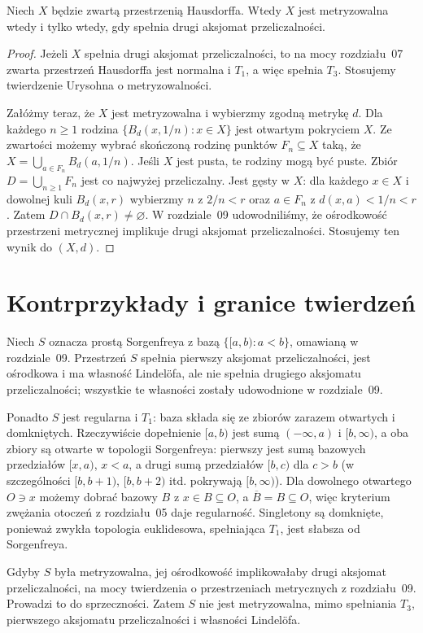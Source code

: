 \begin{wniosek}
\label{cor:topog-zwarta-hausdorff-metryzowalna}
Niech $X$ będzie zwartą przestrzenią Hausdorffa.
Wtedy $X$ jest metryzowalna wtedy i tylko wtedy, gdy
spełnia drugi aksjomat przeliczalności.
\end{wniosek}
\begin{proof}
Jeżeli $X$ spełnia drugi aksjomat przeliczalności,
to na mocy rozdziału~07 zwarta przestrzeń Hausdorffa
jest normalna i $T_1$, a więc spełnia $T_3$.
Stosujemy twierdzenie Urysohna o metryzowalności.

Załóżmy teraz, że $X$ jest metryzowalna i wybierzmy
zgodną metrykę $d$. Dla każdego $n\ge1$ rodzina
$\{B_d(x,1/n):x\in X\}$ jest otwartym pokryciem $X$.
Ze zwartości możemy wybrać skończoną rodzinę
punktów $F_n\subseteq X$ taką, że
$X=\bigcup_{a\in F_n}B_d(a,1/n)$.
Jeśli $X$ jest pusta, te rodziny mogą być puste.
Zbiór $D=\bigcup_{n\ge1}F_n$ jest co najwyżej
przeliczalny. Jest gęsty w $X$: dla każdego
$x\in X$ i dowolnej kuli $B_d(x,r)$ wybierzmy
$n$ z $2/n<r$ oraz $a\in F_n$ z $d(x,a)<1/n<r$.
Zatem $D\cap B_d(x,r)\ne\varnothing$.
W rozdziale~09 udowodniliśmy, że ośrodkowość
przestrzeni metrycznej implikuje drugi aksjomat
przeliczalności. Stosujemy ten wynik do $(X,d)$.
\end{proof}

\section{Kontrprzykłady i granice twierdzeń}
\label{sec:topog-metryzowalnosc-kontrprzyklady}

\begin{przyklad}
\label{ex:topog-sorgenfrey-niemetryzowalna}
Niech $S$ oznacza prostą Sorgenfreya z bazą
$\{[a,b):a<b\}$, omawianą w rozdziale~09.
Przestrzeń $S$ spełnia pierwszy aksjomat przeliczalności,
jest ośrodkowa i ma własność Lindelöfa, ale nie spełnia
drugiego aksjomatu przeliczalności; wszystkie te własności
zostały udowodnione w rozdziale~09.

Ponadto $S$ jest regularna i $T_1$: baza składa się
ze zbiorów zarazem otwartych i domkniętych.
Rzeczywiście dopełnienie $[a,b)$ jest sumą
$(-\infty,a)$ i $[b,\infty)$, a oba zbiory są otwarte
w topologii Sorgenfreya: pierwszy jest sumą bazowych
przedziałów $[x,a)$, $x<a$, a drugi sumą przedziałów
$[b,c)$ dla $c>b$ (w szczególności $[b,b+1)$,
$[b,b+2)$ itd. pokrywają $[b,\infty)$).
Dla dowolnego otwartego $O\ni x$ możemy dobrać
bazowy $B$ z $x\in B\subseteq O$, a
$\overline B=B\subseteq O$, więc kryterium
zwężania otoczeń z rozdziału~05 daje regularność.
Singletony są domknięte, ponieważ zwykła topologia
euklidesowa, spełniająca $T_1$, jest słabsza od
Sorgenfreya.

Gdyby $S$ była metryzowalna, jej ośrodkowość
implikowałaby drugi aksjomat przeliczalności,
na mocy twierdzenia o przestrzeniach metrycznych
z rozdziału~09. Prowadzi to do sprzeczności.
Zatem $S$ nie jest metryzowalna,
mimo spełniania $T_3$, pierwszego aksjomatu
przeliczalności i własności Lindelöfa.
\end{przyklad}


